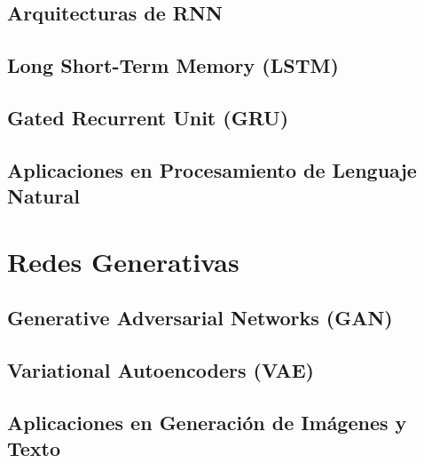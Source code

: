 \documentclass[12pt]{article}
\begin{document}
\subsection{Arquitecturas de RNN}
\newpage
\subsection{Long Short-Term Memory (LSTM)}
\newpage
\subsection{Gated Recurrent Unit (GRU)}
\newpage
\subsection{Aplicaciones en Procesamiento de Lenguaje Natural}
\newpage
\section{Redes Generativas}

\subsection{Generative Adversarial Networks (GAN)}
\newpage
\subsection{Variational Autoencoders (VAE)}
\newpage
\subsection{Aplicaciones en Generación de Imágenes y Texto}
\newpage
\end{document}
